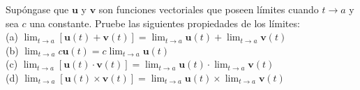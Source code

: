 \item Supóngase que $\mathbf{u}$ y $\mathbf{v}$ son funciones vectoriales que poseen límites cuando $t \to a$ y sea $c$ una constante. Pruebe las siguientes propiedades de los límites: \\
    (a) $\lim_{t \to a} [\mathbf{u}(t) + \mathbf{v}(t)] = \lim_{t \to a} \mathbf{u}(t) + \lim_{t \to a} \mathbf{v}(t)$ \\
    (b) $\lim_{t \to a} c\mathbf{u}(t) = c \lim_{t \to a} \mathbf{u}(t)$ \\
    (c) $\lim_{t \to a} [\mathbf{u}(t) \cdot \mathbf{v}(t)] = \lim_{t \to a} \mathbf{u}(t) \cdot \lim_{t \to a} \mathbf{v}(t)$ \\
    (d) $\lim_{t \to a} [\mathbf{u}(t) \times \mathbf{v}(t)] = \lim_{t \to a} \mathbf{u}(t) \times \lim_{t \to a} \mathbf{v}(t)$
